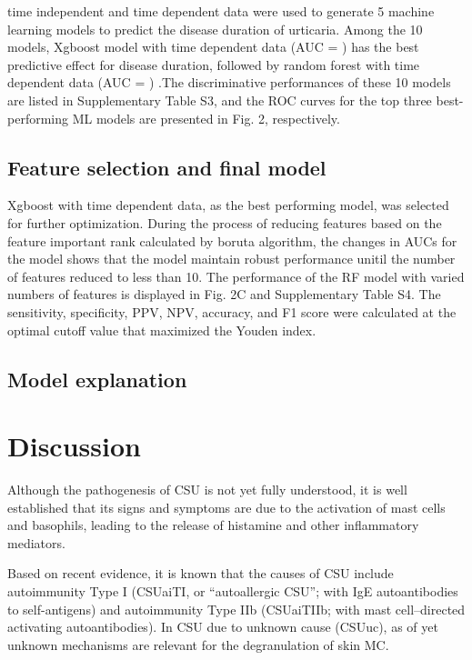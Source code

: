 \documentclass[preprint,12pt,authoryear]{elsarticle}
\begin{document}
time independent and time dependent data were used to generate 5 machine learning models to predict the disease duration of urticaria. Among the 10 models, Xgboost model with time dependent data (AUC = )  has the best predictive effect for disease duration, followed by random forest with time dependent data (AUC = ) .The discriminative performances of these 10 models are listed in Supplementary Table S3, and the ROC curves for the top three best-performing ML models are presented in Fig. 2, respectively. 


\subsection{Feature selection and final model}\label{FinalModel}

Xgboost with time dependent data, as the best performing model, was selected for further optimization. During the process of reducing features based on the feature important rank calculated by boruta algorithm, the changes in AUCs for the model shows that the model maintain robust performance unitil the number of features reduced to less than 10. The performance of the RF model with varied numbers of features is displayed in Fig. 2C and Supplementary Table S4. The sensitivity, specificity, PPV, NPV, accuracy, and F1 score were calculated at the optimal cutoff value that maximized the Youden index.




\subsection{Model explanation}\label{ModelExplanationResults}





\section{Discussion}\label{Discussion}


Although the pathogenesis of CSU is not yet fully understood, it is well established that its signs and symptoms are due to the activation of mast cells and basophils, leading to the release of histamine and other inflammatory mediators\citep{Zuberbier2021The}. 

Based on recent evidence, it is known that the causes of CSU include autoimmunity Type I (CSUaiTI, or “autoallergic CSU”; with IgE autoantibodies to self-antigens) and autoimmunity Type IIb (CSUaiTIIb; with mast cell–directed activating autoantibodies). In CSU due to unknown cause (CSUuc), as of yet unknown mechanisms are relevant for the degranulation of skin MC\citep{sella2023type, Maronese2023IgG}.
\end{document}
